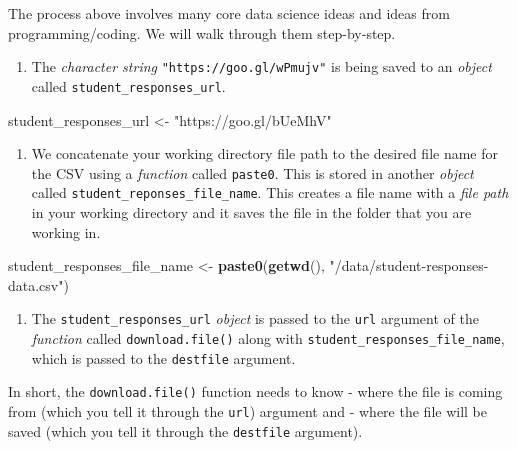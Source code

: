 \documentclass[]{book}
\newenvironment{Shaded}{\begin{snugshade}}{\end{snugshade}}
\newcommand{\KeywordTok}[1]{\textcolor[rgb]{0.13,0.29,0.53}{\textbf{#1}}}
\newcommand{\StringTok}[1]{\textcolor[rgb]{0.31,0.60,0.02}{#1}}
\newcommand{\NormalTok}[1]{#1}
\providecommand{\tightlist}{%
  \setlength{\itemsep}{0pt}\setlength{\parskip}{0pt}}
\begin{document}
The process above involves many core data science ideas and ideas from
programming/coding. We will walk through them step-by-step.

\begin{enumerate}
\def\labelenumi{\arabic{enumi}.}
\tightlist
\item
  The \emph{character string} \texttt{"https://goo.gl/wPmujv"} is being
  saved to an \emph{object} called \texttt{student\_responses\_url}.
\end{enumerate}

\begin{Shaded}
\begin{Highlighting}[]
\NormalTok{student_responses_url <-}
\StringTok{    "https://goo.gl/bUeMhV"}
\end{Highlighting}
\end{Shaded}

\begin{enumerate}
\def\labelenumi{\arabic{enumi}.}
\setcounter{enumi}{1}
\tightlist
\item
  We concatenate your working directory file path to the desired file
  name for the CSV using a \emph{function} called \texttt{paste0}. This
  is stored in another \emph{object} called
  \texttt{student\_reponses\_file\_name}. This creates a file name with
  a \emph{file path} in your working directory and it saves the file in
  the folder that you are working in.
\end{enumerate}

\begin{Shaded}
\begin{Highlighting}[]
\NormalTok{student_responses_file_name <-}
\StringTok{    }\KeywordTok{paste0}\NormalTok{(}\KeywordTok{getwd}\NormalTok{(), }\StringTok{"/data/student-responses-data.csv"}\NormalTok{)}
\end{Highlighting}
\end{Shaded}

\begin{enumerate}
\def\labelenumi{\arabic{enumi}.}
\setcounter{enumi}{2}
\tightlist
\item
  The \texttt{student\_responses\_url} \emph{object} is passed to the
  \texttt{url} argument of the \emph{function} called
  \texttt{download.file()} along with
  \texttt{student\_responses\_file\_name}, which is passed to the
  \texttt{destfile} argument.
\end{enumerate}

In short, the \texttt{download.file()} function needs to know - where
the file is coming from (which you tell it through the \texttt{url})
argument and - where the file will be saved (which you tell it through
the \texttt{destfile} argument).
\end{document}
